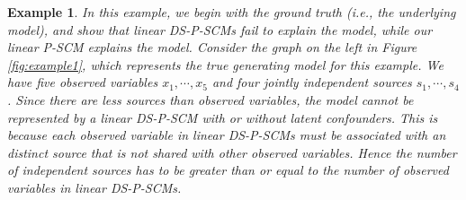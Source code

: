 \documentclass[12pt]{article}
\newtheorem{example}{Example}
\begin{document}
\begin{example} \label{example_1}
In this example, we begin with the ground truth (i.e., the underlying model), and show that linear DS-P-SCMs fail to explain the model, while our linear P-SCM explains the model. Consider the graph on the left in Figure \ref{fig:example1}, which represents the true generating model for this example. We have five observed variables $x_1,\cdots, x_5$ and four jointly independent sources $s_1,\cdots, s_4$. 
Since there are less sources than observed variables, the model cannot be represented by a linear DS-P-SCM with or without latent confounders. %
This is because each observed variable in linear DS-P-SCMs must be associated with an distinct source that is not shared with other observed variables. Hence the number of independent sources has to be greater than or equal to the number of observed variables in linear DS-P-SCMs.


\begin{figure}[t]
\centering
\quad
\quad
\quad
{}
\end{figure}
\end{example}
\end{document}
